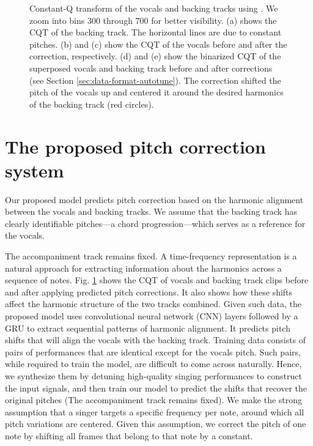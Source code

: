 \begin{figure}[t]
    \caption{
    Constant-Q transform of the vocals and backing tracks using \cite{mcfee2015librosa}. We zoom into bins 300 through 700 for better visibility. (a) shows the CQT of the backing track. The horizontal lines are due to constant pitches. (b) and (c) show the CQT of the vocals before and after the correction, respectively. (d) and (e) show the binarized CQT of the superposed vocals and backing track before and after corrections (see Section \ref{sec:data-format-autotune}). The correction shifted the pitch of the vocals up and centered it around the desired harmonics of the backing track (red circles). 
    }
    \label{fig:model-input-autotune}
\end{figure}

\section{The proposed pitch correction system}
\label{sec:proposed-autotune}
 
Our proposed model predicts pitch correction based on the harmonic alignment between the vocals and backing tracks. We assume that the backing track has clearly identifiable pitches---a chord progression---which serves as a reference for the vocals.

The accompaniment track remains fixed.  
A time-frequency representation is a natural approach for extracting information about the harmonics across a sequence of notes. Fig. \ref{fig:model-input-autotune} shows the CQT of vocals and backing track clips before and after applying predicted pitch corrections. It also shows how these shifts affect the harmonic structure of the two tracks combined. Given such data, the proposed model uses convolutional neural network (CNN) layers followed by a GRU to extract sequential patterns of harmonic alignment. It predicts pitch shifts that will align the vocals with the backing track. 
Training data consists of pairs of performances that are identical except for the vocals pitch. Such pairs, while required to train the model, are difficult to come across naturally. Hence, we synthesize them by detuning high-quality singing performances to construct the input signals, and then train our model to predict the shifts that recover the original pitches (The accompaniment track remains fixed).  
We make the strong assumption that a singer targets a specific frequency per note, around which all pitch variations are centered. Given this assumption, we correct the pitch of one note by shifting all frames that belong to that note by a constant.

